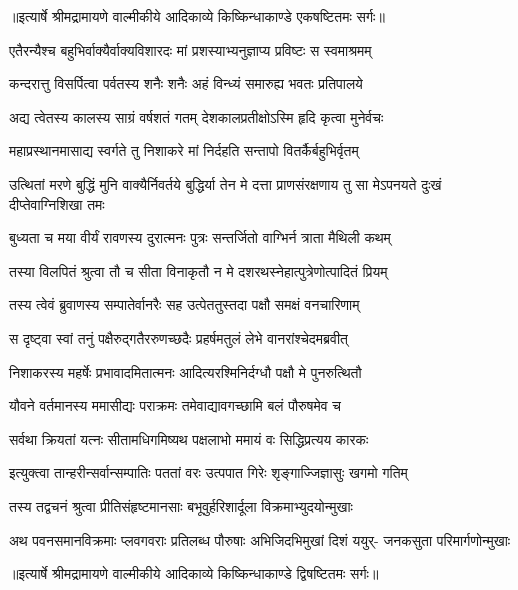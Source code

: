 {॥इत्यार्षे श्रीमद्रामायणे वाल्मीकीये आदिकाव्ये किष्किन्धाकाण्डे एकषष्टितमः सर्गः॥}


\twolineshloka
{एतैरन्यैश्च बहुभिर्वाक्यैर्वाक्यविशारदः}
{मां प्रशस्याभ्यनुज्ञाप्य प्रविष्टः स स्वमाश्रमम्} %

\twolineshloka
{कन्दरात्तु विसर्पित्वा पर्वतस्य शनैः शनैः}
{अहं विन्ध्यं समारुह्य भवतः प्रतिपालये} %

\twolineshloka
{अद्य त्वेतस्य कालस्य साग्रं वर्षशतं गतम्}
{देशकालप्रतीक्षोऽस्मि हृदि कृत्वा मुनेर्वचः} %

\twolineshloka
{महाप्रस्थानमासाद्य स्वर्गते तु निशाकरे}
{मां निर्दहति सन्तापो वितर्कैर्बहुभिर्वृतम्} %

\threelineshloka
{उत्थितां मरणे बुद्धिं मुनि वाक्यैर्निवर्तये}
{बुद्धिर्या तेन मे दत्ता प्राणसंरक्षणाय तु}
{सा मेऽपनयते दुःखं दीप्तेवाग्निशिखा तमः} %

\twolineshloka
{बुध्यता च मया वीर्यं रावणस्य दुरात्मनः}
{पुत्रः सन्तर्जितो वाग्भिर्न त्राता मैथिली कथम्} %

\twolineshloka
{तस्या विलपितं श्रुत्वा तौ च सीता विनाकृतौ}
{न मे दशरथस्नेहात्पुत्रेणोत्पादितं प्रियम्} %

\twolineshloka
{तस्य त्वेवं ब्रुवाणस्य सम्पातेर्वानरैः सह}
{उत्पेततुस्तदा पक्षौ समक्षं वनचारिणाम्} %

\twolineshloka
{स दृष्ट्वा स्वां तनुं पक्षैरुद्गतैररुणच्छदैः}
{प्रहर्षमतुलं लेभे वानरांश्चेदमब्रवीत्} %

\twolineshloka
{निशाकरस्य महर्षेः प्रभावादमितात्मनः}
{आदित्यरश्मिनिर्दग्धौ पक्षौ मे पुनरुत्थितौ} %

\twolineshloka
{यौवने वर्तमानस्य ममासीद्यः पराक्रमः}
{तमेवाद्यावगच्छामि बलं पौरुषमेव च} %

\twolineshloka
{सर्वथा क्रियतां यत्नः सीतामधिगमिष्यथ}
{पक्षलाभो ममायं वः सिद्धिप्रत्यय कारकः} %

\twolineshloka
{इत्युक्त्वा तान्हरीन्सर्वान्सम्पातिः पततां वरः}
{उत्पपात गिरेः शृङ्गाज्जिज्ञासुः खगमो गतिम्} %

\twolineshloka
{तस्य तद्वचनं श्रुत्वा प्रीतिसंहृष्टमानसाः}
{बभूवुर्हरिशार्दूला विक्रमाभ्युदयोन्मुखाः} %

\fourlineindentedshloka
{अथ पवनसमानविक्रमाः}
{प्लवगवराः प्रतिलब्ध पौरुषाः}
{अभिजिदभिमुखां दिशं ययुर्-}
{जनकसुता परिमार्गणोन्मुखाः} %


{॥इत्यार्षे श्रीमद्रामायणे वाल्मीकीये आदिकाव्ये किष्किन्धाकाण्डे द्विषष्टितमः सर्गः॥}

